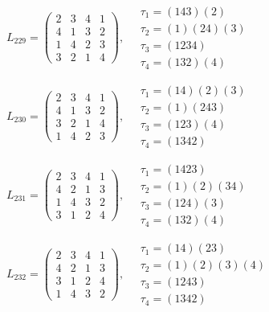 $L_{229} = \begin{pmatrix} 2 & 3 & 4 & 1 \\ 4 & 1 & 3 & 2 \\ 1 & 4 & 2 & 3 \\ 3 & 2 & 1 & 4 \end{pmatrix}, \quad \begin{matrix} \tau_{1} = (1 4 3)(2) \\ \tau_{2} = (1)(2 4)(3) \\ \tau_{3} = (1 2 3 4) \\ \tau_{4} = (1 3 2)(4) \end{matrix}$

$L_{230} = \begin{pmatrix} 2 & 3 & 4 & 1 \\ 4 & 1 & 3 & 2 \\ 3 & 2 & 1 & 4 \\ 1 & 4 & 2 & 3 \end{pmatrix}, \quad \begin{matrix} \tau_{1} = (1 4)(2)(3) \\ \tau_{2} = (1)(2 4 3) \\ \tau_{3} = (1 2 3)(4) \\ \tau_{4} = (1 3 4 2) \end{matrix}$

$L_{231} = \begin{pmatrix} 2 & 3 & 4 & 1 \\ 4 & 2 & 1 & 3 \\ 1 & 4 & 3 & 2 \\ 3 & 1 & 2 & 4 \end{pmatrix}, \quad \begin{matrix} \tau_{1} = (1 4 2 3) \\ \tau_{2} = (1)(2)(3 4) \\ \tau_{3} = (1 2 4)(3) \\ \tau_{4} = (1 3 2)(4) \end{matrix}$

$L_{232} = \begin{pmatrix} 2 & 3 & 4 & 1 \\ 4 & 2 & 1 & 3 \\ 3 & 1 & 2 & 4 \\ 1 & 4 & 3 & 2 \end{pmatrix}, \quad \begin{matrix} \tau_{1} = (1 4)(2 3) \\ \tau_{2} = (1)(2)(3)(4) \\ \tau_{3} = (1 2 4 3) \\ \tau_{4} = (1 3 4 2) \end{matrix}$

